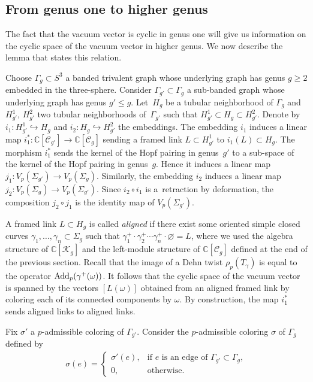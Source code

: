 \documentclass[pdftex]{sigma}
\numberwithin{equation}{section}
\begin{document}
\subsection{From genus one to higher genus}

The fact that the vacuum vector is cyclic in genus one will give us information on the cyclic space of the vacuum vector in higher genus. We now describe the lemma that states this relation.

Choose $\Gamma_g \subset {S}^3$ a banded trivalent graph whose underlying graph has genus $g\geq 2$ embedded in the three-sphere. Consider $\Gamma_{g'}\subset \Gamma_g$ a sub-banded graph whose underlying graph has genus $g'\leq g$. Let~$H_g$ be a tubular neighborhood of $\Gamma_g$ and $H_{g'}^1$, $H_{g'}^2$ two tubular neighborhoods of~$\Gamma_{g'}$ such that $H_{g'}^1\subset H_g \subset H_{g'}^2$. Denote by $i_1\colon H_{g'}^1 \hookrightarrow H_g$ and $i_2\colon H_g \hookrightarrow H_{g'}^2$ the embeddings. The embedding $i_1$ induces a linear map $i_1^*\colon \mathbb{C}[\mathcal{C}_{g'}] \rightarrow \mathbb{C}[\mathcal{C}_g]$ sending a framed link $L\subset H_{g'}^1$ to $i_1(L) \subset H_g$. The morphism $i_1^*$ sends the kernel of the Hopf pairing in genus~$g'$ to a sub-space of the kernel of the Hopf pairing in genus~$g$. Hence it induces a linear map $j_1 \colon V_p(\Sigma_{g'}) \rightarrow V_p(\Sigma_g)$. Similarly, the embedding $i_2$ induces a linear map $j_2\colon V_p(\Sigma_g) \rightarrow V_p(\Sigma_{g'})$. Since $i_2 \circ i_1$ is a~retraction by deformation, the composition $j_2\circ j_1$ is the identity map of $V_p(\Sigma_{g'})$.

A framed link $L\subset H_g$ is called \textit{aligned} if there exist some oriented simple closed curves $\gamma_1, \ldots, \gamma_n\subset \Sigma_g$ such that $\gamma_1^+ \cdot \gamma_2^+ \cdots \gamma_n^+ \cdot \varnothing = L$, where we used the algebra structure of $\mathbb{C}[\mathcal{K}_g]$ and the left-module structure of $\mathbb{C}[\mathcal{C}_g]$ defined at the end of the previous section. Recall that the image of a Dehn twist $\rho_p(T_{\gamma})$ is equal to the operator $\operatorname{Add}_p(\gamma^+(\omega))$. It follows that the cyclic space of the vacuum vector is spanned by the vectors $[L(\omega)]$ obtained from an aligned framed link by coloring each of its connected components by $\omega$. By construction, the map $i_1^*$ sends aligned links to aligned links.

Fix $\sigma'$ a $p$-admissible coloring of $\Gamma_{g'}$. Consider the $p$-admissible coloring $\sigma$ of $\Gamma_g$ defined by
\begin{gather*} \sigma(e)= \begin{cases}
\sigma'(e), & \text{if $e$ is an edge of $\Gamma_{g'}\subset \Gamma_g$},\\
0, & \text{otherwise}.
\end{cases}\end{gather*}
\end{document}
